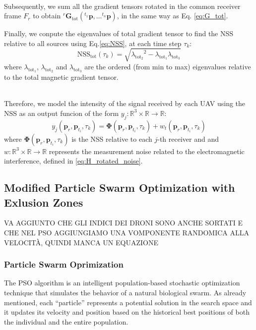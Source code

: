 \noindent
\\
Subsequently, we sum all the gradient tensors rotated in the common receiver frame $F_{r}$
to obtain ${}^{r} \mathbf{G}_{\text{tot}} ({}^{t_1} \mathbf{p}, \dots {}^{t_n} \mathbf{p})$, in the same way as Eq. \ref{eq:G_tot}.

Finally, we conpute the eigenvalues of total gradient 
tensor to find the NSS relative to all sources using Eq.\ref{eq:NSS},
 at each time step \( \tau_k \):
\begin{equation}
    \text{NSS}_\text{tot}(\tau_k) = \sqrt{{\lambda_{\text{tot}_2}}^2 - \lambda_{\text{tot}_1} \lambda_{\text{tot}_3}}
    \label{eq:NSS_multi_final}
\end{equation}
where $\lambda_{\text{tot}_1}$, $\lambda_{\text{tot}_2}$ and $\lambda_{\text{tot}_3}$
are the ordered (from min to max) eigenvalues relative to the total magnetic gradient tensor.

\noindent
\\
Therefore, we model the intensity of the signal received by each UAV using the NSS
as an output funcion of the form \( y_j : \mathbb{R}^3 
\times \mathbb{R} \rightarrow \mathbb{R} \):
\begin{equation}
y_j(\mathbf{p}_{r}, \mathbf{p}_{t_i}, \tau_k) = \mathbf{\Phi}(\mathbf{p}_{r}, \mathbf{p}_{t_i}, \tau_k) + 
w_t(\mathbf{p}_{r}, \mathbf{p}_{t_i}, \tau_k)
\label{eq:received_signal}
\end{equation}
where $\mathbf{\Phi}(\mathbf{p}_{r}, \mathbf{p}_{t_i}, \tau_k)$ is the NSS
relative to each $j$-th receiver and 
and \( w : \mathbb{R}^3 \times \mathbb{R} \rightarrow \mathbb{R} \) 
represents the measurement noise related to the electromagnetic interference,
defined in \ref{eq:H_rotated_noise}.

\subsection{Modified Particle Swarm Optimization with Exlusion Zones}
VA AGGIUNTO CHE GLI INDICI DEI DRONI SONO ANCHE SORTATI E CHE NEL PSO AGGIUNGIAMO
UNA VOMPONENTE RANDOMICA ALLA VELOCITÀ, QUINDI MANCA UN EQUAZIONE
\subsubsection{Particle Swarm Oprimization}
\label{sec:PSO}
The PSO algorithm is an intelligent population-based stochastic optimization technique 
that simulates the behavior of a natural biological swarm. 
As already mentioned, each “particle” represents a potential solution in the search space
and it updates its velocity and position based on the historical best positions 
of both the individual and the entire population.
 
